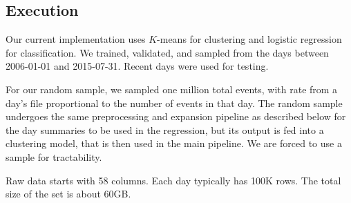\subsection{Execution}

Our current implementation uses $K$-means for clustering and logistic regression for classification. We trained, validated, and sampled from the days between 2006-01-01 and 2015-07-31. Recent days were used for testing.

For our random sample, we sampled one million total events, with rate from a day's file proportional to the number of events in that day. The random sample undergoes the same preprocessing and expansion pipeline as described below for the day summaries to be used in the regression, but its output is fed into a clustering model, that is then used in the main pipeline. We are forced to use a sample for tractability.

Raw data starts with 58 columns. Each day typically has 100K rows. The total size of the set is about 60GB. %

